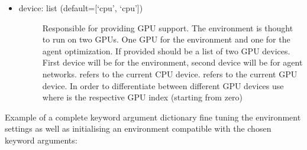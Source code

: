 \documentclass[letterpaper,10pt,english]{sphinxmanual}
\begin{document}
\begin{itemize}
\begin{description}
\begin{itemize}
\begin{description}
\begin{itemize}
\end{itemize}

\end{description}

\item {} \begin{description}
\item[{device: list (default={[}‘cpu’, ‘cpu’{]})}] \leavevmode
\sphinxAtStartPar
Responsible for providing GPU support. The environment is thought to run on two GPUs. One GPU for the
environment and one for the agent optimization. If provided should be a list of two GPU devices. First device
will be for the environment, second device will be for agent networks.  refers to the current CPU
device.  refers to the current GPU device. In order to differentiate between different GPU devices
use  where  is the respective GPU index (starting from zero)

\end{description}

\end{itemize}

\end{description}

\end{itemize}

\sphinxAtStartPar
Example of a complete keyword argument dictionary fine tuning the environment settings as well as initialising an
environment compatible with the chosen keyword arguments:
\end{document}
